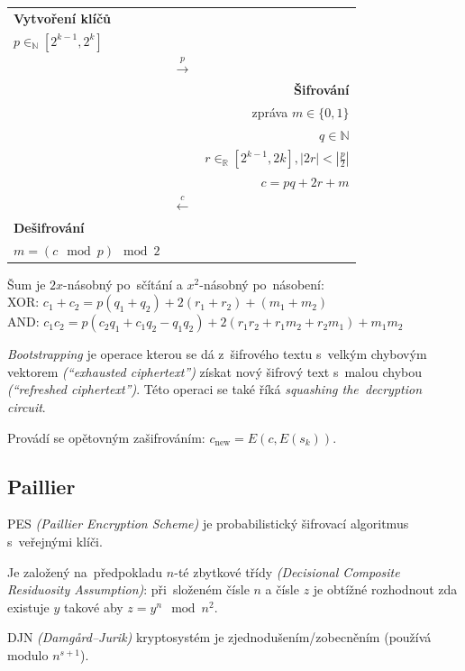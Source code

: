 \begin{table}[ht]
    \centering
    \begin{tabular}{lcr}
    \textbf{Vytvoření klíčů} && \\
    $p \in_\mathbb{N} [2^{k-1}, 2^k]$ \\
    & $\stackrel{p}{\rightarrow}$ & \\
    && \textbf{Šifrování} \\
    && zpráva $m \in \{0,1\}$ \\
    && $q \in \mathbb{N}$ \\
    && $r \in_\mathbb{R} [2^{k-1}, 2k], |2r| < |\frac{p}{2}|$ \\
    && $c = pq + 2r + m$ \\
    & $\stackrel{c}{\leftarrow}$ & \\
    \textbf{Dešifrování} && \\
    $m = (c \mod p) \mod 2$ && \\
    \end{tabular}
\end{table}
\FloatBarrier

Šum je $2x$-násobný po~sčítání a $x^2$-násobný po~násobení:
\\XOR: $c_1 + c_2 = p(q_1 + q_2) + 2(r_1 + r_2) + (m_1 + m_2)$
\\AND: $c_1 c_2 = p(c_2 q_1 + c_1 q_2 - q_1 q_2) + 2(r_1 r_2 + r_1 m_2 + r_2 m_1) + m_1 m_2$


\emph{Bootstrapping} je operace kterou se dá z~šifrového textu s~velkým chybovým vektorem \emph{(\enquote{exhausted ciphertext})} získat nový šifrový text s~malou chybou \emph{(\enquote{refreshed ciphertext})}.
Této operaci se také říká \emph{squashing the~decryption circuit}.

Provádí se opětovným zašifrováním: $c_\text{new} = E(c, E(s_k))$.

\subsection{Paillier}

PES \emph{(Paillier Encryption Scheme)} je probabilistický šifrovací algoritmus s~veřejnými klíči.

Je založený na~předpokladu $n$-té zbytkové třídy \emph{(Decisional Composite Residuosity Assumption)}: při~složeném čísle $n$ a čísle $z$ je obtížné rozhodnout zda existuje $y$ takové aby $z = y^n \mod n^2$.

DJN \emph{(Damgård--Jurik)} kryptosystém je zjednodušením/zobecněním (používá modulo $n^{s+1}$).

